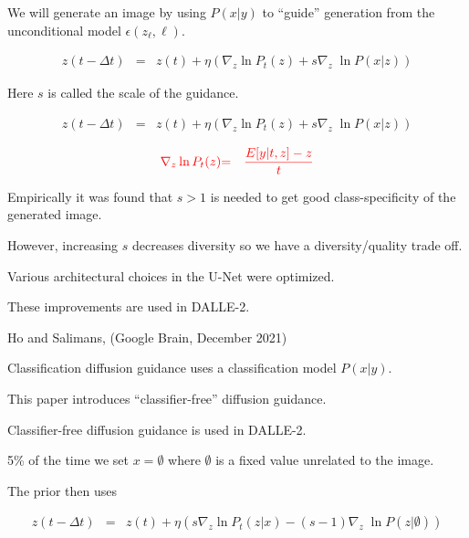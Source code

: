 {\vfill
We will generate an image by using $P(x|y)$ to ``guide'' generation from the unconditional model $\epsilon(z_\ell,\ell)$.

\begin{eqnarray*}
z(t - \Delta t) & = & z(t) + \eta\left(\nabla_z\ln P_t(z) +  s \nabla_z\;\ln P(x|z)\right)
\end{eqnarray*}

\vfill
Here $s$ is called the scale of the guidance.


\begin{eqnarray*}
z(t - \Delta t) & = & z(t) + \eta\left(\nabla_z\ln P_t(z) + s \nabla_z\;\ln P(x|z)\right)
\end{eqnarray*}

\vfill
\begin{eqnarray*}
{\color{red} \nabla_z \ln P_t(z)}&  {\color{red}  =} & {\color{red}\frac{E[y|t,z]-z}{t}}
\end{eqnarray*}


\vfill
Empirically it was found that $s > 1$ is needed to get good class-specificity of the generated image.

\vfill
However, increasing $s$ decreases diversity so we have a diversity/quality trade off.


Various architectural choices in the U-Net were optimized.

\vfill
These improvements are used in DALLE-2.

{Ho and Salimans, (Google Brain, December 2021)}

Classification diffusion guidance uses a classification model $P(x|y)$.

\vfill
This paper introduces ``classifier-free'' diffusion guidance.

\vfill
Classifier-free diffusion guidance is used in DALLE-2.


5\% of the time we set $x = \emptyset$ where $\emptyset$ is a fixed value unrelated to the image.

\vfill
The prior then uses

\vfill
\begin{eqnarray*}
z(t - \Delta t) & = & z(t) + \eta\left(s\nabla_z\ln P_t(z|x) - (s-1) \nabla_z\;\ln P(z|\emptyset)\right)
\end{eqnarray*}

}
